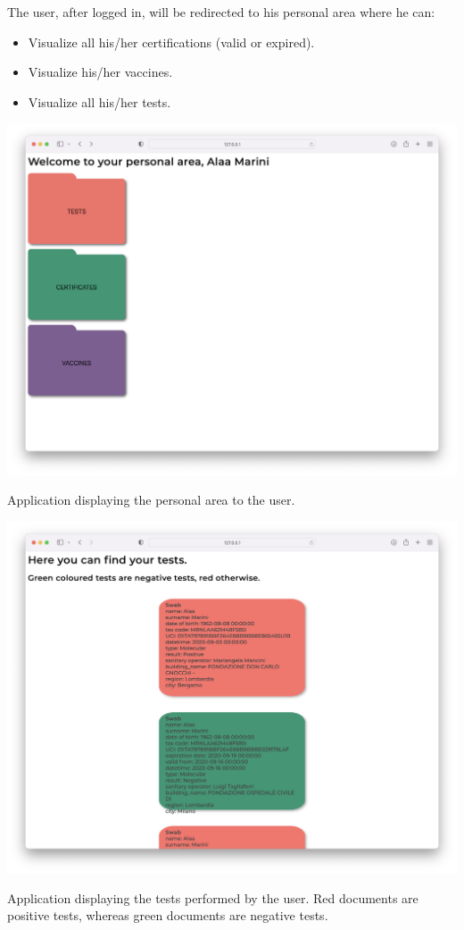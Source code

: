 \documentclass{article}
\begin{document}
The user, after logged in, will be redirected to his personal area where he can:
\begin{itemize}
    \item Visualize all his/her certifications (valid or expired).
    \item Visualize his/her vaccines.
    \item Visualize all his/her tests.
\end{itemize}
\begin{center}
\includegraphics[scale=0.23]{home.png}
    \caption{Application displaying the personal area to the user.}
    
\end{center}

\begin{center}
\includegraphics[scale=0.23]{tests.png}
    \caption{Application displaying the tests performed by the user. Red documents are positive tests, whereas green documents are negative tests.}\end{center}
\end{document}
